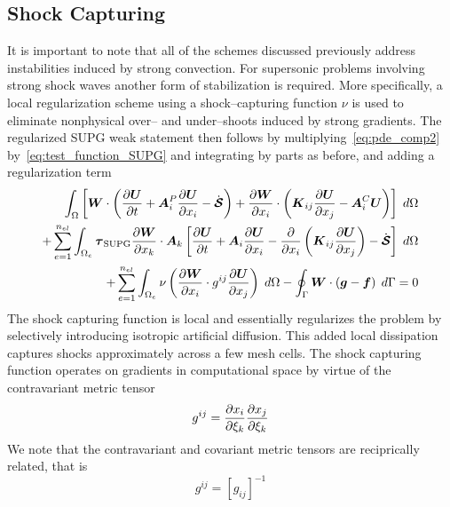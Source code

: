 \subsection{Shock Capturing}
It is important to note that all of the schemes discussed previously address instabilities induced by strong convection.  For supersonic problems involving strong shock waves another form of stabilization is required.  More specifically, a local regularization scheme using a shock--capturing function $\nu$ is used to eliminate nonphysical over-- and under--shoots induced by strong gradients.  The regularized SUPG weak statement then follows by multiplying~\eqref{eq:pde_comp2} by~\eqref{eq:test_function_SUPG} and integrating by parts as before, and adding a regularization term
\begin{eqnarray}
  \label{eq:comp_weak_SUPG_SC}
  \int_\Omega  \left[ {\boldsymbol{W}}\cdot\left({\frac{\partial{{\boldsymbol{U}}}}{\partial{t}}} + {\boldsymbol{A}}^P_i {\frac{\partial{{\boldsymbol{U}}}}{\partial{x_i}}} - \dot{{\boldsymbol{\mathcal{S}}}} \right) + {\frac{\partial{{\boldsymbol{W}}}}{\partial{x_i}}} \cdot \left( {\boldsymbol{K}}_{ij} {\frac{\partial{{\boldsymbol{U}}}}{\partial{x_j}}} - {\boldsymbol{A}}^C_i {\boldsymbol{U}}\right)\right] \; d\Omega \nonumber \\
  + \sum_{e=1}^{n_{el}} \int_{\Omega_e} {\boldsymbol{\tau}}_{\text{SUPG}} {\frac{\partial{{\boldsymbol{W}}}}{\partial{x_k}}}\cdot{\boldsymbol{A}}_k
  \left[ {\frac{\partial{{\boldsymbol{U}}}}{\partial{t}}} + {\boldsymbol{A}}_i {\frac{\partial{{\boldsymbol{U}}}}{\partial{x_i}}} - {\frac{\partial{}}{\partial{x_i}}} \left( {\boldsymbol{K}}_{ij} {\frac{\partial{{\boldsymbol{U}}}}{\partial{x_j}}} \right) - \dot{{\boldsymbol{\mathcal{S}}}} \right] \; d\Omega  \nonumber \\
  + \sum_{e=1}^{n_{el}} \int_{\Omega_e} \nu \left({\frac{\partial{{\boldsymbol{W}}}}{\partial{x_i}}}\cdot g^{ij} {\frac{\partial{{\boldsymbol{U}}}}{\partial{x_j}}}\right)\; d\Omega
   -\oint_\Gamma {\boldsymbol{W}}\cdot\left({\boldsymbol{g}} - {\boldsymbol{f}}\right) \; d\Gamma = 0
\end{eqnarray}
The shock capturing function is local and essentially regularizes the problem by selectively introducing isotropic artificial diffusion. This added local dissipation captures shocks approximately across a few mesh cells.  The shock capturing function operates on gradients in computational space by virtue of the contravariant metric tensor
\begin{equation}
  g^{ij} = {\frac{\partial{x_i}}{\partial{\xi_k}}}{\frac{\partial{x_j}}{\partial{\xi_k}}}
\end{equation}
We note that the contravariant and covariant metric tensors are reciprically related, that is
\begin{equation}
  g^{ij} = \left[g_{ij}\right]^{-1}
\end{equation}

